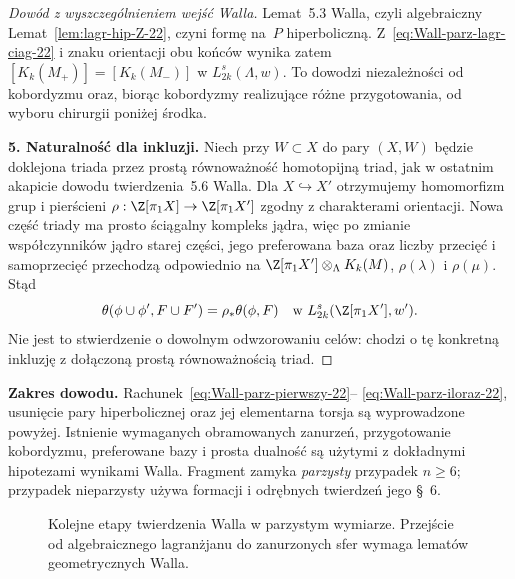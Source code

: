\begin{proof}[Dowód z wyszczególnieniem wejść Walla]
Lemat~5.3 Walla, czyli algebraiczny
Lemat~\ref{lem:lagr-hip-Z-22}, czyni formę
na~$P$ hiperboliczną. Z~\eqref{eq:Wall-parz-lagr-ciag-22}
i znaku orientacji obu końców wynika zatem
$[K_k(M_+)]=[K_k(M_-)]$ w $L^s_{2k}(\Lambda,w)$.
To dowodzi niezależności od kobordyzmu oraz,
biorąc kobordyzmy realizujące różne przygotowania,
od wyboru chirurgii poniżej środka.

\textbf{5. Naturalność dla inkluzji.}
Niech przy $W\subset X$ do pary $(X,W)$ będzie
doklejona triada przez prostą równoważność
homotopijną triad, jak w ostatnim akapicie dowodu
twierdzenia~5.6 Walla. Dla $X\hookrightarrow X'$
otrzymujemy homomorfizm grup i pierścieni
$\rho:\Z[\pi_1X]\to\Z[\pi_1X']$ zgodny
z charakterami orientacji. Nowa część triady
ma prosto ściągalny kompleks jądra, więc po
zmianie współczynników jądro starej części,
jego preferowana baza oraz liczby przecięć
i samoprzecięć przechodzą odpowiednio na
$\Z[\pi_1X']\otimes_{\Lambda}K_k(M)$,
$\rho(\lambda)$ i $\rho(\mu)$. Stąd
\[
 \theta(\phi\cup\phi',F\cup F')
       =\rho_*\theta(\phi,F)
       \quad\text{w }L^s_{2k}(\Z[\pi_1X'],w').
\]
Nie jest to stwierdzenie o dowolnym odwzorowaniu
celów: chodzi o tę konkretną inkluzję z dołączoną
prostą równoważnością triad.
\end{proof}

\noindent\textbf{Zakres dowodu.}
Rachunek~\eqref{eq:Wall-parz-pierwszy-22}--
\eqref{eq:Wall-parz-iloraz-22}, usunięcie pary
hiperbolicznej oraz jej elementarna torsja są
wyprowadzone powyżej. Istnienie wymaganych
obramowanych zanurzeń, przygotowanie kobordyzmu,
preferowane bazy i prosta dualność są użytymi
z dokładnymi hipotezami wynikami Walla.
Fragment zamyka \emph{parzysty} przypadek $n\geq6$;
przypadek nieparzysty używa formacji i odrębnych
twierdzeń jego §~6.

\begin{figure}[htbp]
\centering
{}
\caption{Kolejne etapy twierdzenia Walla w parzystym wymiarze.
Przejście od algebraicznego lagranżjanu do zanurzonych
sfer wymaga lematów geometrycznych Walla.}
\label{fig:mechanizm-Wall-22}
\end{figure}


